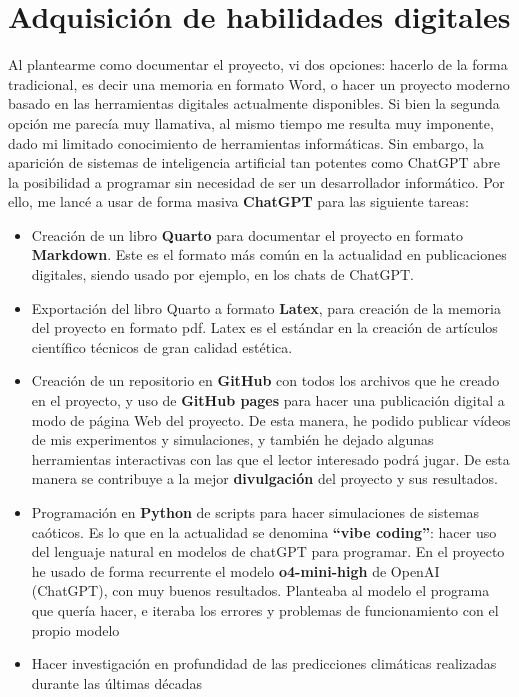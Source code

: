 \documentclass[
  10pt,
  a4paper,
  DIV=11,
  numbers=noendperiod,
  open=any]{scrreprt}
\numberwithin{equation}{chapter}
\numberwithin{equation}{section}
\renewcommand{\[}{\begin{equation}}
\renewcommand{\]}{\end{equation}}
\begin{document}
\section{Adquisición de habilidades
digitales}\label{adquisiciuxf3n-de-habilidades-digitales}

Al plantearme como documentar el proyecto, vi dos opciones: hacerlo de
la forma tradicional, es decir una memoria en formato Word, o hacer un
proyecto moderno basado en las herramientas digitales actualmente
disponibles. Si bien la segunda opción me parecía muy llamativa, al
mismo tiempo me resulta muy imponente, dado mi limitado conocimiento de
herramientas informáticas. Sin embargo, la aparición de sistemas de
inteligencia artificial tan potentes como ChatGPT abre la posibilidad a
programar sin necesidad de ser un desarrollador informático. Por ello,
me lancé a usar de forma masiva \textbf{ChatGPT} para las siguiente
tareas:

\begin{itemize}
\item
  Creación de un libro \textbf{Quarto} para documentar el proyecto en
  formato \textbf{Markdown}. Este es el formato más común en la
  actualidad en publicaciones digitales, siendo usado por ejemplo, en
  los chats de ChatGPT.
\item
  Exportación del libro Quarto a formato \textbf{Latex}, para creación
  de la memoria del proyecto en formato pdf. Latex es el estándar en la
  creación de artículos científico técnicos de gran calidad estética.
\item
  Creación de un repositorio en \textbf{GitHub} con todos los archivos
  que he creado en el proyecto, y uso de \textbf{GitHub pages} para
  hacer una publicación digital a modo de página Web del proyecto. De
  esta manera, he podido publicar vídeos de mis experimentos y
  simulaciones, y también he dejado algunas herramientas interactivas
  con las que el lector interesado podrá jugar. De esta manera se
  contribuye a la mejor \textbf{divulgación} del proyecto y sus
  resultados.
\item
  Programación en \textbf{Python} de scripts para hacer simulaciones de
  sistemas caóticos. Es lo que en la actualidad se denomina
  \textbf{``vibe coding''}: hacer uso del lenguaje natural en modelos de
  chatGPT para programar. En el proyecto he usado de forma recurrente el
  modelo \textbf{o4-mini-high} de OpenAI (ChatGPT), con muy buenos
  resultados. Planteaba al modelo el programa que quería hacer, e
  iteraba los errores y problemas de funcionamiento con el propio modelo
\item
  Hacer investigación en profundidad de las predicciones climáticas
  realizadas durante las últimas décadas
\end{itemize}
\end{document}
